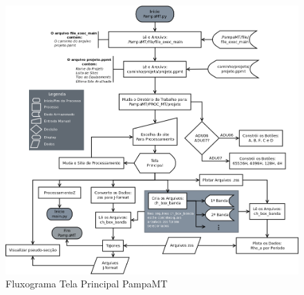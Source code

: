     \begin{figure}[H]
                \caption{Fluxograma Tela Principal PampaMT}
                \begin{center}
                    \includegraphics[width=15cm]{texto/fig/PampaMTpy.png} 
                \end{center}
                \label{fig_influ_pampamtpy} 
            \end{figure}
